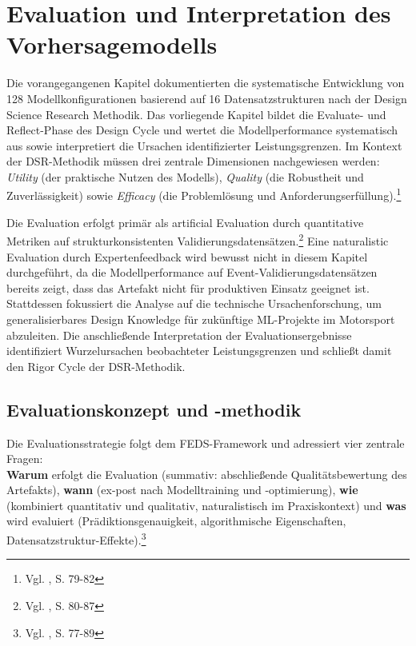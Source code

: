 \chapter{Evaluation und Interpretation des Vorhersagemodells}

Die vorangegangenen Kapitel dokumentierten die systematische Entwicklung von 128 Modellkonfigurationen basierend auf 16 Datensatzstrukturen nach der Design Science Research Methodik. Das vorliegende Kapitel bildet die Evaluate- und Reflect-Phase des Design Cycle und wertet die Modellperformance systematisch aus sowie interpretiert die Ursachen identifizierter Leistungsgrenzen. Im Kontext der DSR-Methodik müssen drei zentrale Dimensionen nachgewiesen werden: \textit{Utility} (der praktische Nutzen des Modells), \textit{Quality} (die Robustheit und Zuverlässigkeit) sowie \textit{Efficacy} (die Problemlösung und Anforderungserfüllung).\footnote{Vgl. \cite{Venable2016}, S. 79-82}

Die Evaluation erfolgt primär als artificial Evaluation durch quantitative Metriken auf strukturkonsistenten Validierungsdatensätzen.\footnote{Vgl. \cite{Venable2016}, S. 80-87} Eine naturalistic Evaluation durch Expertenfeedback wird bewusst nicht in diesem Kapitel durchgeführt, da die Modellperformance auf Event-Validierungsdatensätzen bereits zeigt, dass das Artefakt nicht für produktiven Einsatz geeignet ist. Stattdessen fokussiert die Analyse auf die technische Ursachenforschung, um generalisierbares Design Knowledge für zukünftige \ac{ML}-Projekte im Motorsport abzuleiten. Die anschließende Interpretation der Evaluationsergebnisse identifiziert Wurzelursachen beobachteter Leistungsgrenzen und schließt damit den Rigor Cycle der DSR-Methodik.


\section{Evaluationskonzept und -methodik}

Die Evaluationsstrategie folgt dem FEDS-Framework und adressiert vier zentrale Fragen: \\ \textbf{Warum} erfolgt die Evaluation (summativ: abschließende Qualitätsbewertung des Artefakts), \textbf{wann} (ex-post nach Modelltraining und -optimierung), \textbf{wie} (kombiniert quantitativ und qualitativ, naturalistisch im Praxiskontext) und \textbf{was} wird evaluiert (Prädiktionsgenauigkeit, algorithmische Eigenschaften, Datensatzstruktur-Effekte).\footnote{Vgl. \cite{Venable2016}, S. 77-89}


